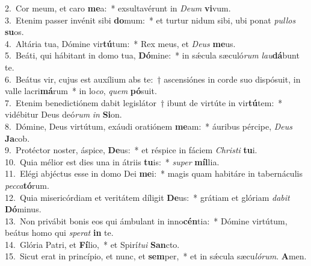 {2.~}Cor meum, et caro \textbf{me}a:~* exsultavérunt in \textit{De}\textit{um} \textbf{vi}vum.\\
{3.~}Etenim passer invénit sibi \textbf{do}mum:~* et turtur nidum sibi, ubi ponat \textit{pul}\textit{los} \textbf{su}os.\\
{4.~}Altária tua, Dómine vir\textbf{tú}tum:~* Rex meus, et \textit{De}\textit{us} \textbf{me}us.\\
{5.~}Beáti, qui hábitant in domo tua, \textbf{Dó}mine:~* in sǽcula sæculó\textit{rum} \textit{lau}\textbf{dá}bunt te.\\
{6.~}Beátus vir, cujus est auxílium abs te:~† ascensiónes in corde suo dispósuit, in valle lacri\textbf{má}rum~* in lo\textit{co}, \textit{quem} \textbf{pó}suit.\\
{7.~}Etenim benedictiónem dabit legislátor~† ibunt de virtúte in vir\textbf{tú}tem:~* vidébitur Deus deó\textit{rum} \textit{in} \textbf{Si}on.\\
{8.~}Dómine, Deus virtútum, exáudi oratiónem \textbf{me}am:~* áuribus pércipe, \textit{De}\textit{us} \textbf{Ja}cob.\\
{9.~}Protéctor noster, áspice, \textbf{De}us:~* et réspice in fáciem \textit{Chri}\textit{sti} \textbf{tu}i.\\
{10.~}Quia mélior est dies una in átriis \textbf{tu}is:~* \textit{su}\textit{per} \textbf{míl}lia.\\
{11.~}Elégi abjéctus esse in domo Dei \textbf{me}i:~* magis quam habitáre in tabernáculis \textit{pec}\textit{ca}\textbf{tó}rum.\\
{12.~}Quia misericórdiam et veritátem díligit \textbf{De}us:~* grátiam et glóriam \textit{da}\textit{bit} \textbf{Dó}minus.\\
{13.~}Non privábit bonis eos qui ámbulant in inno\textbf{cén}tia:~* Dómine virtútum, beátus homo qui \textit{spe}\textit{rat} \textbf{in} te.\\
{14.~}Glória Patri, et \textbf{Fí}lio,~* et Spirí\textit{tu}\textit{i} \textbf{San}cto.\\
{15.~}Sicut erat in princípio, et nunc, et \textbf{sem}per,~* et in sǽcula sæcu\textit{ló}\textit{rum}. \textbf{A}men.\\
